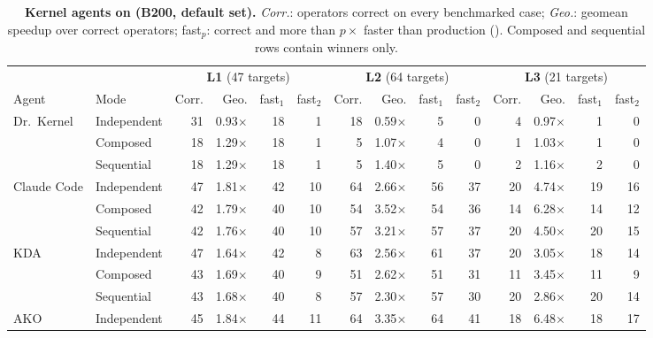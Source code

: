 \begin{table}[t]
  \centering
  \caption{\textbf{Kernel agents on \FastKernels (B200, default set).}
  \emph{Corr.}: operators correct on every benchmarked case; \emph{Geo.}: geomean speedup over correct operators; fast$_p$: correct and more than $p\times$ faster than production ().
  Composed and sequential rows contain winners only.}
  \label{fastkernels:tab:kernel-levels}
  \small
  \setlength{\tabcolsep}{3pt}
  \begin{adjustbox}{max width=\linewidth}
\begin{tabular}{@{}llrrrrrrrrrrrr@{}}
\toprule
 & & \multicolumn{4}{c}{\textbf{L1} (47 targets)} & \multicolumn{4}{c}{\textbf{L2} (64 targets)} & \multicolumn{4}{c}{\textbf{L3} (21 targets)} \\
\cmidrule(lr){3-6}\cmidrule(lr){7-10}\cmidrule(lr){11-14}
Agent & Mode & Corr. & Geo. & fast$_{1}$ & fast$_{2}$ & Corr. & Geo. & fast$_{1}$ & fast$_{2}$ & Corr. & Geo. & fast$_{1}$ & fast$_{2}$ \\
\midrule
\multirow{3}{*}{Dr.~Kernel} & Independent & 31 & 0.93$\times$ & 18 & 1 & 18 & 0.59$\times$ & 5 & 0 & 4 & 0.97$\times$ & 1 & 0 \\
 & Composed & 18 & 1.29$\times$ & 18 & 1 & 5 & 1.07$\times$ & 4 & 0 & 1 & 1.03$\times$ & 1 & 0 \\
 & Sequential & 18 & 1.29$\times$ & 18 & 1 & 5 & 1.40$\times$ & 5 & 0 & 2 & 1.16$\times$ & 2 & 0 \\
\midrule
\multirow{3}{*}{Claude Code} & Independent & 47 & 1.81$\times$ & 42 & 10 & 64 & 2.66$\times$ & 56 & 37 & 20 & 4.74$\times$ & 19 & 16 \\
 & Composed & 42 & 1.79$\times$ & 40 & 10 & 54 & 3.52$\times$ & 54 & 36 & 14 & 6.28$\times$ & 14 & 12 \\
 & Sequential & 42 & 1.76$\times$ & 40 & 10 & 57 & 3.21$\times$ & 57 & 37 & 20 & 4.50$\times$ & 20 & 15 \\
\midrule
\multirow{3}{*}{KDA} & Independent & 47 & 1.64$\times$ & 42 & 8 & 63 & 2.56$\times$ & 61 & 37 & 20 & 3.05$\times$ & 18 & 14 \\
 & Composed & 43 & 1.69$\times$ & 40 & 9 & 51 & 2.62$\times$ & 51 & 31 & 11 & 3.45$\times$ & 11 & 9 \\
 & Sequential & 43 & 1.68$\times$ & 40 & 8 & 57 & 2.30$\times$ & 57 & 30 & 20 & 2.86$\times$ & 20 & 14 \\
\midrule
\multirow{3}{*}{AKO} & Independent & 45 & 1.84$\times$ & 44 & 11 & 64 & 3.35$\times$ & 64 & 41 & 18 & 6.48$\times$ & 18 & 17 \\

\end{tabular}
\end{adjustbox}
\end{table}
